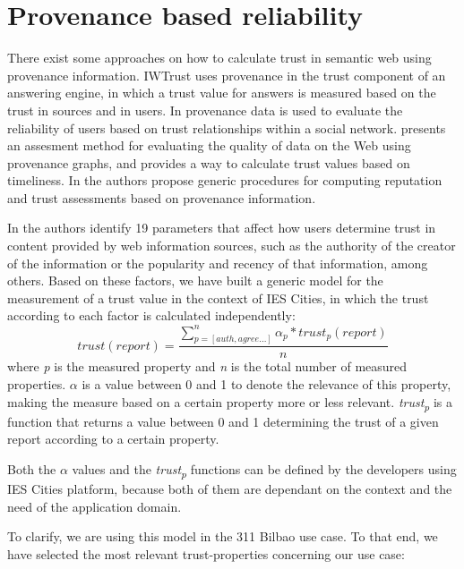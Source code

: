 \section{Provenance based reliability}
\label{sec:provenance}

There exist some approaches on how to calculate trust in semantic web using provenance information. IWTrust \cite{zaihrayeu2005iwtrust} uses provenance in the trust component of an answering engine, in which a trust value for answers is measured based on the trust in sources and in users. In \cite{golbeck2006combining} provenance data is used to evaluate the reliability of users based on trust relationships within a social network. \cite{Hartig09usingweb} presents an assesment method for evaluating the quality of data on the Web using provenance graphs, and provides a way to calculate trust values based on timeliness. In \cite{CeolinGHNF12} the authors propose generic procedures for computing reputation and trust assessments based on provenance information. 

In \cite{gil2007towards} the authors identify 19 parameters that affect how users determine trust in content provided by web information sources, such as the authority of the creator of the information or the popularity and recency of that information, among others. Based on these factors, we have built a generic model for the measurement of a trust value in the context of IES Cities, in which the trust according to each factor is calculated independently:
%
\begin{equation}
trust(report) = \frac{\sum_{p=[auth, agree...]}^{n} \alpha_p * trust_p(report)}{n}
\end{equation}
%
where \textit{p} is the measured property and \textit{n} is the total number of measured properties. {$\alpha$} is a value between 0 and 1 to denote the relevance of this property, making the measure based on a certain property more or less relevant. \textit{trust\textsubscript{p}} is a function that returns a value between 0 and 1 determining the trust of a given report according to a certain property.

Both the $\alpha$ values and the \textit{trust\textsubscript{p}} functions can be defined by the developers using IES Cities platform, because both of them are dependant on the context and the need of the application domain.

To clarify, we are using this model in the 311 Bilbao use case. To that end, we have selected the most relevant trust-properties concerning our use case:

